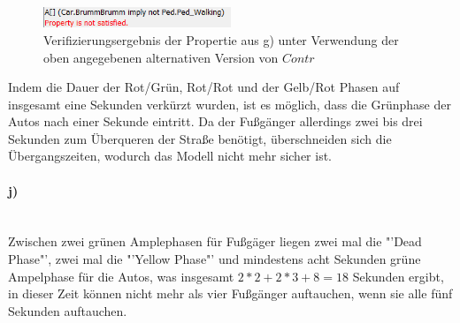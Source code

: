\begin{figure}[H] 
	\centering 
	\includegraphics[width=0.5\textwidth]{./UPAAAL_Screens/2i_Verified}
	\caption[Aufgabe 2i)]{Verifizierungsergebnis der Propertie aus g) unter Verwendung der oben angegebenen alternativen Version von $Contr$}    
\end{figure}

Indem die Dauer der Rot/Grün, Rot/Rot und der Gelb/Rot Phasen auf insgesamt eine Sekunden verkürzt wurden, ist es möglich, dass die Grünphase der Autos nach einer Sekunde eintritt. Da der Fußgänger allerdings zwei bis drei Sekunden zum Überqueren der Straße benötigt, überschneiden sich die Übergangszeiten, wodurch das Modell nicht mehr sicher ist.



\paragraph{j)}\mbox{} \\

Zwischen zwei grünen Amplephasen für Fußgäger liegen zwei mal die "'Dead Phase"', zwei mal die "'Yellow Phase"' und mindestens acht Sekunden grüne Ampelphase für die Autos, was insgesamt $2*2+2*3+8=18$ Sekunden ergibt, in dieser Zeit können nicht mehr als vier Fußgänger auftauchen, wenn sie alle fünf Sekunden auftauchen.

